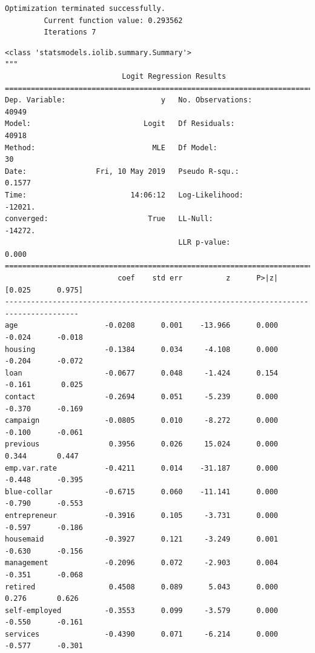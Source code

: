 \documentclass[8pt,onecolumn,aps,pra]{revtex4-1}
\begin{document}
    \begin{Verbatim}[commandchars=\\\{\}]
Optimization terminated successfully.
         Current function value: 0.293562
         Iterations 7

    \end{Verbatim}

    
    \begin{verbatim}
<class 'statsmodels.iolib.summary.Summary'>
"""
                           Logit Regression Results                           
==============================================================================
Dep. Variable:                      y   No. Observations:                40949
Model:                          Logit   Df Residuals:                    40918
Method:                           MLE   Df Model:                           30
Date:                Fri, 10 May 2019   Pseudo R-squ.:                  0.1577
Time:                        14:06:12   Log-Likelihood:                -12021.
converged:                       True   LL-Null:                       -14272.
                                        LLR p-value:                     0.000
=======================================================================================
                          coef    std err          z      P>|z|      [0.025      0.975]
---------------------------------------------------------------------------------------
age                    -0.0208      0.001    -13.966      0.000      -0.024      -0.018
housing                -0.1384      0.034     -4.108      0.000      -0.204      -0.072
loan                   -0.0677      0.048     -1.424      0.154      -0.161       0.025
contact                -0.2694      0.051     -5.239      0.000      -0.370      -0.169
campaign               -0.0805      0.010     -8.272      0.000      -0.100      -0.061
previous                0.3956      0.026     15.024      0.000       0.344       0.447
emp.var.rate           -0.4211      0.014    -31.187      0.000      -0.448      -0.395
blue-collar            -0.6715      0.060    -11.141      0.000      -0.790      -0.553
entrepreneur           -0.3916      0.105     -3.731      0.000      -0.597      -0.186
housemaid              -0.3927      0.121     -3.249      0.001      -0.630      -0.156
management             -0.2096      0.072     -2.903      0.004      -0.351      -0.068
retired                 0.4508      0.089      5.043      0.000       0.276       0.626
self-employed          -0.3553      0.099     -3.579      0.000      -0.550      -0.161
services               -0.4390      0.071     -6.214      0.000      -0.577      -0.301

\end{verbatim}
\end{document}
